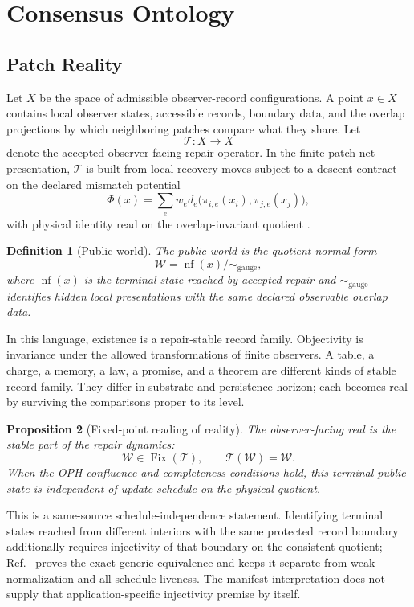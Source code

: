 \documentclass[11pt]{article}
\newtheorem{definition}{Definition}[section]
\newtheorem{proposition}[definition]{Proposition}
\theoremstyle{remark}
\theoremstyle{plain}
\newcommand{\World}{\mathcal W}
\newcommand{\Repair}{\mathcal T}
\newcommand{\NF}{\operatorname{nf}}
\newcommand{\Fix}{\operatorname{Fix}}
\begin{document}
\section{Consensus Ontology}

\subsection{Patch Reality}

Let \(X\) be the space of admissible observer-record configurations. A point
\(x\in X\) contains local observer states, accessible records, boundary data,
and the overlap projections by which neighboring patches compare what they
share. Let
\[
\Repair:X\to X
\]
denote the accepted observer-facing repair operator. In the finite patch-net
presentation, \(\Repair\) is built from local recovery moves subject to a
descent contract on the declared mismatch potential
\[
\Phi(x)=\sum_e w_e d_e\bigl(\pi_{i,e}(x_i),\pi_{j,e}(x_j)\bigr),
\]
with physical identity read on the overlap-invariant quotient
\cite{OPHConsensus}.

\begin{definition}[Public world]
The public world is the quotient-normal form
\[
\World=\NF(x)\big/\!\sim_{\mathrm{gauge}},
\]
where \(\NF(x)\) is the terminal state reached by accepted repair and
\(\sim_{\mathrm{gauge}}\) identifies hidden local presentations with the same
declared observable overlap data.
\end{definition}

In this language, existence is a repair-stable record family. Objectivity is
invariance under the allowed transformations of finite observers. A table, a
charge, a memory, a law, a promise, and a theorem are different kinds of stable
record family. They differ in substrate and persistence horizon; each becomes
real by surviving the comparisons proper to its level.

\begin{proposition}[Fixed-point reading of reality]
The observer-facing real is the stable part of the repair dynamics:
\[
\World\in\Fix(\Repair), \qquad \Repair(\World)=\World .
\]
When the OPH confluence and completeness conditions hold, this terminal public
state is independent of update schedule on the physical quotient.
\end{proposition}

This is a same-source schedule-independence statement.  Identifying terminal states reached from
different interiors with the same protected record boundary additionally requires injectivity of
that boundary on the consistent quotient; Ref.~\cite{observableNormalForms} proves the exact
generic equivalence and keeps it separate from weak normalization and all-schedule liveness.  The
manifest interpretation does not supply that application-specific injectivity premise by itself.
\end{document}
